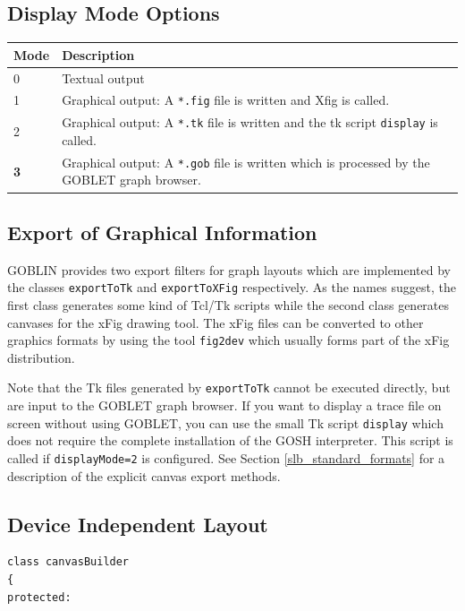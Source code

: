 \documentclass[a4paper,11pt,twoside]{book}
\begin{document}
\begin{multicols}{2}
\subsection{Display Mode Options}
\label{slb_display_mode}
\medskip
\begin{center}
\begin{tabular}{|p{1.2cm}|p{10.9cm}|}
\hline
{\bf Mode} & {\bf Description} \\
\hline
\hline
0 & Textual output \\
\hline
1 & Graphical output: A \verb/*.fig/ file is written and Xfig is called. \\
\hline
2 & Graphical output: A \verb/*.tk/ file is written and the tk script
    \verb/display/ is called. \\
\hline
{\bf 3} & Graphical output: A \verb/*.gob/ file is written which is processed 
    by the GOBLET graph browser. \\
\hline
\end{tabular}
\end{center}
\bigskip

\subsection{Export of Graphical Information}

GOBLIN provides two export filters for graph layouts which are implemented by
the classes \verb/exportToTk/ and \verb/exportToXFig/ respectively. As the names
suggest, the first class generates some kind of Tcl/Tk scripts while the second
class generates canvases for the xFig drawing tool. The xFig files can be
converted to other graphics formats by using the tool \verb/fig2dev/ which
usually forms part of the xFig distribution.

Note that the Tk files generated by \verb/exportToTk/ cannot be executed directly,
but are input to the GOBLET graph browser. If you want to display a trace file
on screen without using GOBLET, you can use the small Tk script \verb/display/
which does not require the complete installation of the GOSH interpreter. This
script is called if \verb/displayMode=2/ is configured. See Section
\ref{slb_standard_formats} for a description of the explicit canvas export methods.


\newpage
\subsection{Device Independent Layout}
\begin{mymethods}
\begin{verbatim}
class canvasBuilder
{
protected:


\end{verbatim}
\end{mymethods}
\end{multicols}
\end{document}
